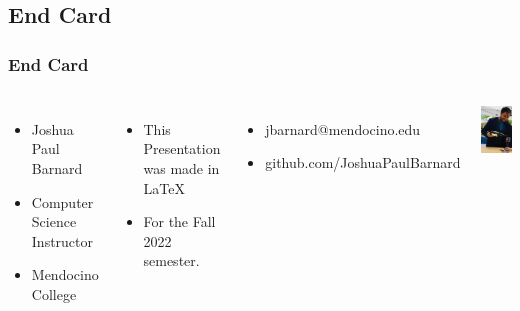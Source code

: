 \documentclass{beamer}
\begin{document}
	\section{}	
		\subsection{End Card}
	\begin{frame}
		\frametitle{End Card}	
		\begin{columns}
			\vspace{-25pt}
			\begin{itemize}
				\item Joshua Paul Barnard
				\item Computer Science Instructor
				\item Mendocino College
			\end{itemize}
			\begin{itemize}
				\item This Presentation was made in \LaTeX
				\item For the Fall 2022 semester.  
			\end{itemize}
			\begin{itemize}
				\item jbarnard@mendocino.edu
				\item github.com/JoshuaPaulBarnard
			\end{itemize}
			\includegraphics[width=.85\textwidth]{images/shone farm wine pouring - vert.png}
		\end{columns}
	\end{frame}
	
\end{document}
